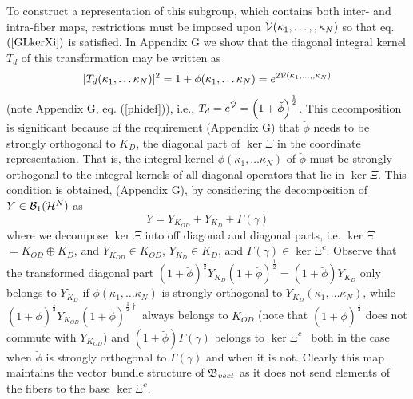 To construct a representation of this subgroup, which contains both inter-
and intra-fiber maps, restrictions must be imposed upon ${\cal V}(\kappa
_{1},\ldots ,,\kappa _{N})$ so that eq. $\left( \ref{GLkerXi}\right) $ is
satisfied. In Appendix G we show that the diagonal integral kernel $T_{d}$
of this transformation may be written as 
\begin{equation}
|T_{d}(\kappa _{1},\ldots \kappa _{N})|^{2}=1+\phi (\kappa _{1},\ldots
\kappa _{N})=e^{2{\cal V}(\kappa _{1},\ldots ,,\kappa _{N})}
\end{equation}%
(note Appendix G, eq. (\ref{phidef})), i.e., $T_{d}=e^{\breve{{\cal V}}%
}=\left( 1+\breve{\phi}\right) ^{\frac{1}{2}}$. This decomposition is
significant because of the requirement (Appendix G) that $\breve{\phi}$
needs to be strongly orthogonal to $K_{D}$, the diagonal part of $\ker \Xi $
in the coordinate representation. That is, the integral kernel $\phi (\kappa
_{1},\ldots \kappa _{N})$ of $\breve{\phi}$ must be strongly orthogonal to
the integral kernels of all diagonal operators that lie in $\ker \Xi $. This
condition is obtained, (Appendix G), by considering the decomposition of $%
Y\in {\cal B}_{1}({\cal H}^{N})$ as 
\begin{equation}
Y=Y_{K_{OD}}+Y_{K_{D}}+\Gamma \left( \gamma \right)
\end{equation}%
where we decompose $\ker \Xi $ into off diagonal and diagonal parts, i.e. $%
\ker \Xi $ $=K_{OD}\oplus K_{D}$, and $Y_{K_{OD}}\in K_{OD}$, $Y_{K_{D}}\in
K_{D}$, and $\Gamma \left( \gamma \right) \in \ker \Xi ^{c}$. Observe that
the transformed diagonal part $\left( 1+\breve{\phi}\right) ^{\frac{1}{2}%
}Y_{K_{D}}\left( 1+\breve{\phi}\right) ^{\frac{1}{2}}=\left( 1+\breve{\phi}%
\right) Y_{K_{D}}$ only belongs to $Y_{K_{D}}$ if $\phi \left( \kappa
_{1},\ldots \kappa _{N}\right) $ is strongly orthogonal to $Y_{K_{D}}\left(
\kappa _{1},\ldots \kappa _{N}\right) $, while $\left( 1+\breve{\phi}\right)
^{\frac{1}{2}}Y_{K_{OD}}\left( 1+\breve{\phi}\right) ^{\frac{1}{2}\dagger }$
always belongs to $K_{OD}$ (note that $\left( 1+\breve{\phi}\right) ^{\frac{1%
}{2}}$ does not commute with $Y_{K_{OD}}$) and $\left( 1+\breve{\phi}\right)
\Gamma \left( \gamma \right) $ belongs to $\ker \Xi ^{c\text{ }}$ both in
the case when $\breve{\phi}$ is strongly orthogonal to $\Gamma \left( \gamma
\right) $ and when it is not. Clearly this map maintains the vector bundle
structure of ${\frak B}_{vect}$ as it does not send elements of the fibers
to the base $\ker \Xi ^{c}$.

